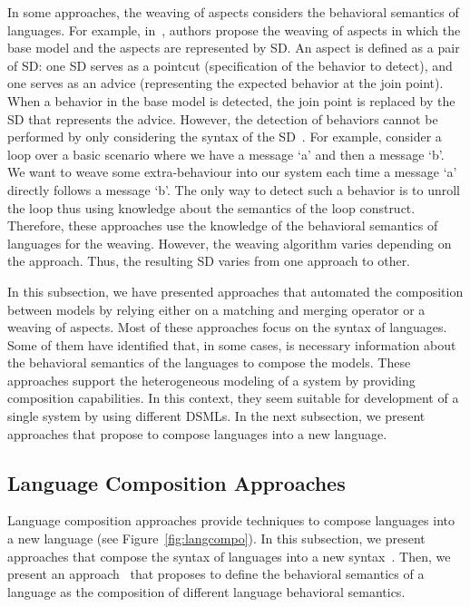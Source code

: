 In some approaches, the weaving of aspects considers the behavioral semantics of languages. For example, in~\cite{rambib}, authors propose the weaving of aspects in which the base model and the aspects are represented by SD. An aspect is defined as a pair of SD: one SD serves as a pointcut (specification of the behavior to detect), and one serves as an advice (representing the expected behavior at the join point). When a behavior in the base model is detected, the join point is replaced by the SD that represents the advice. However, the detection of behaviors cannot be performed by only considering the syntax of the SD~\cite{problemsweavebib}. For example, consider a loop over a basic scenario where we have a message `a' and then a message `b'. We want to weave some extra-behaviour into our system each time a message `a' directly follows a message `b'. The only way to detect such a behavior is to unroll the loop thus using knowledge about the semantics of the loop construct. Therefore, these approaches use the knowledge of the behavioral semantics of languages for the weaving. However, the weaving algorithm varies depending on the approach. Thus, the resulting SD varies from one approach to other.

In this subsection, we have presented approaches that automated the composition between models by relying either on a matching and merging operator or a weaving of aspects. Most of these approaches focus on the syntax of languages. Some of them have identified that, in some cases, is necessary information about the behavioral semantics of the languages to compose the models. These approaches support the heterogeneous modeling of a system by providing composition capabilities. In this context, they seem suitable for development of a single system by using different DSMLs. In the next subsection, we present approaches that propose to compose languages into a new language.

\subsection{Language Composition Approaches}
Language composition approaches provide techniques to compose languages into a new language (see Figure~\ref{fig:langcompo}). In this subsection, we present approaches that compose the syntax of languages into a new syntax~\cite{metamodelcompo}. Then, we present an approach~\cite{semanticsanchoring} that proposes to define the behavioral semantics of a language as the composition of different language behavioral semantics. 

